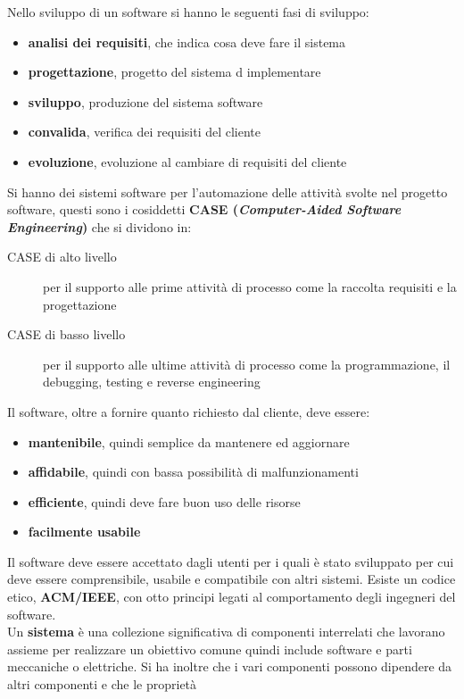 \documentclass[a4paper,12pt, oneside]{book}
\begin{document}
Nello sviluppo di un software si hanno le seguenti fasi di sviluppo:
\begin{itemize}
\item \textbf{analisi dei requisiti}, che indica cosa deve fare il sistema
\item \textbf{progettazione}, progetto del sistema d implementare 
\item \textbf{sviluppo}, produzione del sistema software
\item \textbf{convalida}, verifica dei requisiti del cliente
\item \textbf{evoluzione}, evoluzione al cambiare di requisiti del cliente
\end{itemize} 
Si hanno dei sistemi software per l'automazione delle attività svolte nel progetto software, 
questi sono i cosiddetti \textbf{CASE (\textit{Computer-Aided Software Engineering})} che si dividono in:
\begin{description}
    \item [CASE di alto livello] per il supporto alle prime attività di processo come la raccolta requisiti e la progettazione
    \item [CASE di basso livello] per il supporto alle ultime attività di processo come la programmazione,
                                  il debugging, testing e reverse engineering
\end{description}
Il software, oltre a fornire quanto richiesto dal cliente, deve essere:
\begin{itemize}
\item \textbf{mantenibile}, quindi semplice da mantenere ed aggiornare
\item \textbf{affidabile}, quindi con bassa possibilità di malfunzionamenti
\item \textbf{efficiente}, quindi deve fare buon uso delle risorse
\item \textbf{facilmente usabile}
\end{itemize}
Il software deve essere accettato dagli utenti per i quali è stato sviluppato per cui deve essere comprensibile, 
usabile e compatibile con altri sistemi.
Esiste un codice etico, \textbf{ACM/IEEE}, con otto principi legati al comportamento degli ingegneri del software.\\
Un \textbf{sistema} è una collezione significativa di componenti interrelati che lavorano assieme per realizzare
un obiettivo comune quindi include software e parti meccaniche o elettriche.
Si ha inoltre che i vari componenti possono dipendere da altri componenti e che le proprietà
\end{document}
